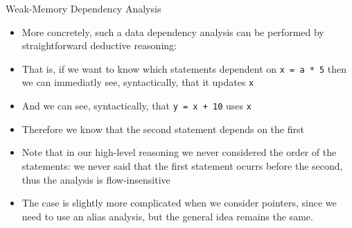 \documentclass[t]{beamer}
\begin{document}
\begin{frame}[c]{Weak-Memory Dependency Analysis}
{\begin{itemize}
        \texttt{x} plus ten then we know this second statement is affected by
        the first
      \item More concretely, such a data dependency analysis can be performed
        by straightforward deductive reasoning:
      \item That is, if we want to know which statements dependent on \texttt{x
        = a * 5} then we can immediatly see, syntactically, that it updates
        \texttt{x}
      \item And we can see, syntactically, that \texttt{y = x + 10} uses
        \texttt{x}
      \item Therefore we know that the second statement depends on the first
      \item Note that in our high-level reasoning we never considered the order
        of the statements: we never said that the first statement ocurrs before
        the second, thus the analysis is flow-insensitive
      \item The case is slightly more complicated when we consider pointers,
        since we need to use an alias analysis, but the general idea remains
        the same.
    \end{itemize}
  }
\end{frame}
\end{document}
